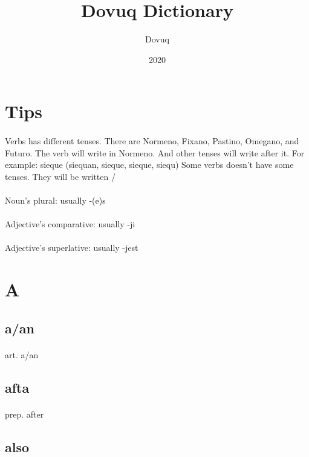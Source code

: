 \documentclass[UTF8]{article}
\title{Dovuq Dictionary}
\author{Dovuq}
\date{2020}
\begin{document}
    \setcounter{section}{-1}
    \setcounter{tocdepth}{1}
    \maketitle
    \newpage
    \tableofcontents
    \newpage
    \section{Tips}
    \paragraph{}
    Verbs has different tenses. There are Normeno, Fixano, Pastino, Omegano, and Futuro. The verb will write in Normeno. And other tenses will write after it. For example: sieque (siequan, sieque, sieque, siequ) Some verbs doesn't have some tenses. They will be written /
    \paragraph{}
    Noun's plural: usually -(e)s
    \paragraph{}
    Adjective's comparative: usually -ji
    \paragraph{}
    Adjective's superlative: usually -jest
    \newpage \section{A}
    \subsection{a/an}
    \paragraph{} art. a/an 
    \subsection{afta}
    \paragraph{} prep. after 
    \subsection{also}
\end{document}
